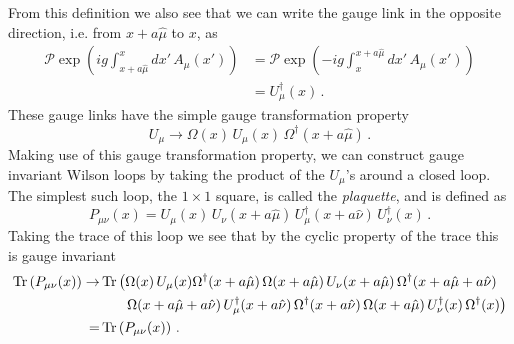From this definition we also see that we can write the gauge link in the opposite direction, i.e. from $x+a\hat{\mu}$ to $x$, as
\begin{align*}
\mathcal{P}\exp\left(ig\int^x_{x+a\hat{\mu}}dx'\,A_\mu(x')\right) &= \mathcal{P}\exp\left(-ig\int_x^{x+a\hat{\mu}}dx'\,A_\mu(x')\right)\\
&=U^\dag_\mu(x)\, .
\end{align*}
These gauge links have the simple gauge transformation property~\cite{Lepage:1998dt}
\begin{equation}
U_\mu\rightarrow \Omega(x)\,U_\mu(x)\,\Omega^\dag(x+a\hat{\mu})\, .
\end{equation}
Making use of this gauge transformation property, we can construct gauge invariant Wilson loops by taking the product of the $U_\mu$'s around a closed loop. The simplest such loop, the $1\times 1$ square, is called the \textit{plaquette}, and is defined as
\begin{equation}
P_{\mu\nu}(x) = U_\mu(x)\,U_\nu(x+a\hat{\mu})\, U_\mu^\dag(x+a\hat{\nu})\, U_\nu^\dag(x)\, .
\label{eq:Plaquette}
\end{equation}
Taking the trace of this loop we see that by the cyclic property of the trace this is gauge invariant
\begin{align*}
\operatorname{Tr}\left(P_{\mu\nu}(x)\right)\rightarrow& \operatorname{Tr} \left(\Omega(x)\,U_\mu(x)\Omega^\dag(x+a\hat{\mu})\,\Omega(x+a\hat{\mu})\,U_\nu(x+a\hat{\mu})\,\Omega^\dag(x+a\hat{\mu}+a\hat{\nu})\right.\\
&~~~~~\left.\Omega(x+a\hat{\mu}+a\hat{\nu})\,U_\mu^\dag(x+a\hat{\nu})\,\Omega^\dag(x+a\hat{\nu})\,\Omega(x+a\hat{\mu})\, U_\nu^\dag(x)\,\Omega^\dag(x)\right)\\
=&\operatorname{Tr}\left(P_{\mu\nu}(x)\right)\, .
\end{align*}

